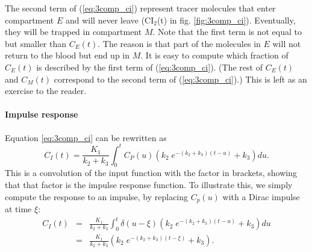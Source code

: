 The second term of (\ref{eq:3comp_ci}) represent tracer molecules that
enter compartment $E$ and will never leave (CI$_2$(t) in
fig. \ref{fig:3comp_ci}). Eventually, they will be trapped in
compartment $M$. Note that the first term is not equal to but smaller
than $C_E(t)$. The reason is that part of the molecules in $E$ will
not return to the blood but end up in $M$. It is easy to compute which
fraction of $C_E(t)$ is described by the first term of
(\ref{eq:3comp_ci}). (The rest of $C_E(t)$ and $C_M(t)$ correspond to
the second term of (\ref{eq:3comp_ci}).) This is left as an exercise
to the reader.

\paragraph{Impulse response\\}
Equation \ref{eq:3comp_ci} can be rewritten as
\begin{equation}
  C_I(t) = \frac{K_1}{k_2 + k_3} \int_0^t C_P(u) \left(
       k_2 \; e^{-(k_2 + k_3)(t - u)} + k_3 \right) du.
\end{equation}
This is a convolution of the input function with the factor in
brackets, showing that that factor is the impulse response
function. To illustrate this, we simply compute the response to an
impulse, by replacing $C_p(u)$ with a Dirac impulse at time $\xi$:
\begin{eqnarray}
  C_I(t) &=& \frac{K_1}{k_2 + k_3} \int_0^t \delta(u-\xi) \left(
                k_2 \; e^{-(k_2 + k_3)(t - u)} + k_3 \right) du\\
   &=& \frac{K_1}{k_2 + k_3} \left( k_2 \; e^{-(k_2 + k_3)(t - \xi)} +
                k_3 \right).
\end{eqnarray}



